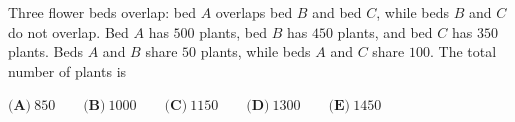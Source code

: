 Three flower beds overlap: bed $A$ overlaps bed $B$ and bed $C$, while beds $B$ and $C$ do not overlap. Bed $A$ has $500$ plants, bed $B$ has $450$ plants, and bed $C$ has $350$ plants. Beds $A$ and $B$ share $50$ plants, while beds $A$ and $C$ share $100$. The total number of plants is

$\textbf{(A)}\ 850\qquad\textbf{(B)}\ 1000\qquad\textbf{(C)}\ 1150\qquad\textbf{(D)}\ 1300\qquad\textbf{(E)}\ 1450$
